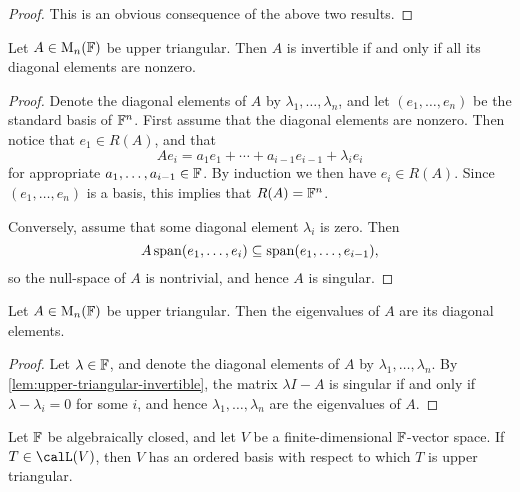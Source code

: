\begin{proof}
    This is an obvious consequence of the above two results.
\end{proof}


\begin{lemma}
    \label{lem:upper-triangular-invertible}
    Let $A \in \mathrm{M}_{n}(\mathbb{F})$ be upper triangular. Then $A$ is invertible if and only if all its diagonal elements are nonzero.
\end{lemma}

\begin{proof}
    Denote the diagonal elements of $A$ by $\lambda_1, \ldots, \lambda_n$, and let $(e_1, \ldots, e_n)$ be the standard basis of $\mathbb{F}^n$. First assume that the diagonal elements are nonzero. Then notice that $e_1 \in R(A)$, and that
    \begin{equation*}
        A e_i
            = a_1 e_1 + \cdots + a_{i-1} e_{i-1} + \lambda_i e_i
    \end{equation*}
    for appropriate $a_1, \ldots, a_{i-1} \in \mathbb{F}$. By induction we then have $e_i \in R(A)$. Since $(e_1, \ldots, e_n)$ is a basis, this implies that $R(A) = \mathbb{F}^n$.

    Conversely, assume that some diagonal element $\lambda_i$ is zero. Then
    \begin{equation*}
        A \operatorname{span}(e_1, \ldots, e_i)
            \subseteq \operatorname{span}(e_1, \ldots, e_{i-1}),
    \end{equation*}
    so the null-space of $A$ is nontrivial, and hence $A$ is singular.
\end{proof}


\begin{lemma}
    Let $A \in \mathrm{M}_{n}(\mathbb{F})$ be upper triangular. Then the eigenvalues of $A$ are its diagonal elements.
\end{lemma}

\begin{proof}
    Let $\lambda \in \mathbb{F}$, and denote the diagonal elements of $A$ by $\lambda_1, \ldots, \lambda_n$. By \cref{lem:upper-triangular-invertible}, the matrix $\lambda I - A$ is singular if and only if $\lambda - \lambda_i = 0$ for some $i$, and hence $\lambda_1, \ldots, \lambda_n$ are the eigenvalues of $A$.
\end{proof}


\begin{proposition}
    \label{prop:upper-triangular-basis-exists}
    Let $\mathbb{F}$ be algebraically closed, and let $V$ be a finite-dimensional $\mathbb{F}$-vector space. If $T \in \lin(V)$, then $V$ has an ordered basis with respect to which $T$ is upper triangular.
\end{proposition}

